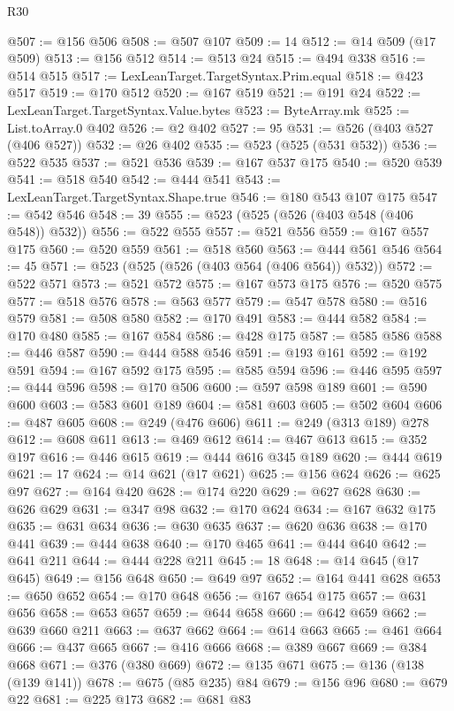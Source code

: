 \begin{lexlean}{R30}
\begin{coremodule}
@507 := @156 @506
@508 := @507 @107
@509 := 14
@512 := @14 @509 (@17 @509)
@513 := @156 @512
@514 := @513 @24
@515 := @494 @338
@516 := @514 @515
@517 := LexLeanTarget.TargetSyntax.Prim.equal
@518 := @423 @517
@519 := @170 @512
@520 := @167 @519
@521 := @191 @24
@522 := LexLeanTarget.TargetSyntax.Value.bytes
@523 := ByteArray.mk
@525 := List.toArray.{0} @402
@526 := @2 @402
@527 := 95
@531 := @526 (@403 @527 (@406 @527))
@532 := @26 @402
@535 := @523 (@525 (@531 @532))
@536 := @522 @535
@537 := @521 @536
@539 := @167 @537 @175
@540 := @520 @539
@541 := @518 @540
@542 := @444 @541
@543 := LexLeanTarget.TargetSyntax.Shape.true
@546 := @180 @543 @107 @175
@547 := @542 @546
@548 := 39
@555 := @523 (@525 (@526 (@403 @548 (@406 @548)) @532))
@556 := @522 @555
@557 := @521 @556
@559 := @167 @557 @175
@560 := @520 @559
@561 := @518 @560
@563 := @444 @561 @546
@564 := 45
@571 := @523 (@525 (@526 (@403 @564 (@406 @564)) @532))
@572 := @522 @571
@573 := @521 @572
@575 := @167 @573 @175
@576 := @520 @575
@577 := @518 @576
@578 := @563 @577
@579 := @547 @578
@580 := @516 @579
@581 := @508 @580
@582 := @170 @491
@583 := @444 @582
@584 := @170 @480
@585 := @167 @584
@586 := @428 @175
@587 := @585 @586
@588 := @446 @587
@590 := @444 @588 @546
@591 := @193 @161
@592 := @192 @591
@594 := @167 @592 @175
@595 := @585 @594
@596 := @446 @595
@597 := @444 @596
@598 := @170 @506
@600 := @597 @598 @189
@601 := @590 @600
@603 := @583 @601 @189
@604 := @581 @603
@605 := @502 @604
@606 := @487 @605
@608 := @249 (@476 @606)
@611 := @249 (@313 @189) @278
@612 := @608 @611
@613 := @469 @612
@614 := @467 @613
@615 := @352 @197
@616 := @446 @615
@619 := @444 @616 @345 @189
@620 := @444 @619
@621 := 17
@624 := @14 @621 (@17 @621)
@625 := @156 @624
@626 := @625 @97
@627 := @164 @420
@628 := @174 @220
@629 := @627 @628
@630 := @626 @629
@631 := @347 @98
@632 := @170 @624
@634 := @167 @632 @175
@635 := @631 @634
@636 := @630 @635
@637 := @620 @636
@638 := @170 @441
@639 := @444 @638
@640 := @170 @465
@641 := @444 @640
@642 := @641 @211
@644 := @444 @228 @211
@645 := 18
@648 := @14 @645 (@17 @645)
@649 := @156 @648
@650 := @649 @97
@652 := @164 @441 @628
@653 := @650 @652
@654 := @170 @648
@656 := @167 @654 @175
@657 := @631 @656
@658 := @653 @657
@659 := @644 @658
@660 := @642 @659
@662 := @639 @660 @211
@663 := @637 @662
@664 := @614 @663
@665 := @461 @664
@666 := @437 @665
@667 := @416 @666
@668 := @389 @667
@669 := @384 @668
@671 := @376 (@380 @669)
@672 := @135 @671
@675 := @136 (@138 (@139 @141))
@678 := @675 (@85 @235) @84
@679 := @156 @96
@680 := @679 @22
@681 := @225 @173
@682 := @681 @83

\end{coremodule}
\end{lexlean}
